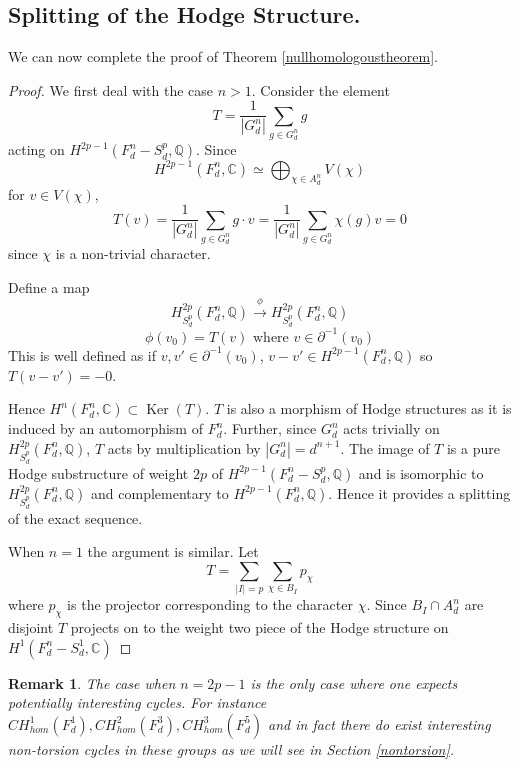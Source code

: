 \documentclass[12pt,reqno]{article}
\newtheorem{rem}[defn]{Remark}
\newcommand {\C}{{\mathds C}}
\newcommand {\Q}{{\mathds Q}}
\def\Ker{\operatorname{Ker}}
\begin{document}
\subsection{Splitting of the Hodge Structure.}

We can now complete the proof of Theorem \ref{nullhomologoustheorem}.

\begin{proof} We first deal with the case $n>1$. Consider the element 
	$$T=\frac{1}{|G_d^n|} \sum_{g \in G_d^n} g$$
acting on $H^{2p-1}(F^n_d-S_d^p,\Q)$. Since 
%
$$H^{2p-1}(F_d^n,\C)\simeq \bigoplus_{\chi \in A^n_d} V(\chi)$$
%
for  $v \in V(\chi)$, 
 $$T(v)= \frac{1}{|G_d^n|}    \sum_{g \in G_d^n}  g\cdot v = \frac{1}{|G_d^n|}  \sum_{g \in G_d^n} \chi(g)v=0$$
 since $\chi$ is a non-trivial character. 
 
Define a map
%
$$ H^{2p}_{S_d^p}(F_d^n,\Q) \stackrel{\phi}{\longrightarrow} H^{2p}_{S_d^p}(F_d^n,\Q)$$
$$ \phi(v_0)=T(v) \text{ where } v \in \partial^{-1}(v_0)$$
%
This is well defined as if $v, v'\in \partial^{-1}(v_0)$, $v-v' \in H^{2p-1}(F_d^n,\Q)$ so $T(v-v')=-0$. 
 
  
 
 
 Hence $H^n(F_d^n,\C) \subset \Ker(T)$. $T$ is also a morphism of Hodge structures as it is induced by an automorphism of $F_d^n$. Further, since $G_d^n$ acts trivially on  $H^{2p}_{S_d^p}(F_d^n,\Q)$, $T$ acts by multiplication by $|G_d^n|=d^{n+1}$. The image of $T$ is a pure Hodge substructure of weight $2p$ of $H^{2p-1}(F^n_d-S_d^p,\Q)$ and is isomorphic to $H^{2p}_{S_d^p}(F_d^n,\Q)$ and complementary to $H^{2p-1}(F^n_d,\Q)$. Hence it provides a splitting of the exact sequence. 
 
 
 When $n=1$ the argument is similar. Let 
 $$ T=\sum_{|I|=p} \sum_{\chi \in B_I} p_{\chi}$$
 where $p_{\chi}$ is the projector corresponding to the character $\chi$. 
 Since $B_I \cap A_d^n$ are disjoint $T$ projects on to the weight two piece of the Hodge structure on $H^1(F_d^n-S_d^1,\C)$ 
 
 \end{proof}
 
 \begin{rem} The case when $n=2p-1$ is the only case where one expects potentially interesting cycles. For instance $CH^1_{hom}(F_d^1), CH^2_{hom}(F_d^3), CH^3_{hom}(F_d^5)$ and in fact there do exist interesting non-torsion cycles in these groups as we will see in Section \ref{nontorsion}. 



\end{rem}
\end{document}
